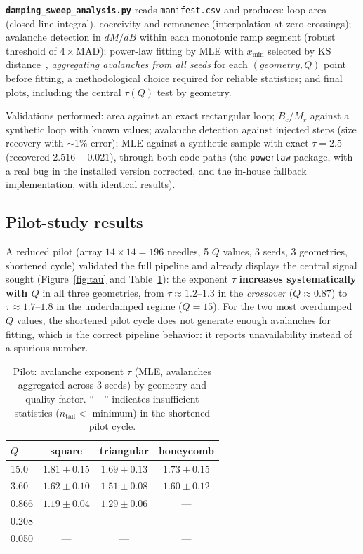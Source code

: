 \documentclass[11pt,a4paper]{article}
\newcommand{\code}[1]{\texttt{#1}}
\begin{document}
\textbf{\code{damping\_sweep\_analysis.py}} reads \code{manifest.csv} and produces: loop area (closed-line integral), coercivity and remanence (interpolation at zero crossings); avalanche detection in $dM/dB$ within each monotonic ramp segment (robust threshold of $4\times$MAD); power-law fitting by MLE with $x_{\min}$ selected by KS distance~\cite{clauset2009}, \emph{aggregating avalanches from all seeds} for each $(geometry, Q)$ point before fitting, a methodological choice required for reliable statistics; and final plots, including the central $\tau(Q)$ test by geometry.

Validations performed: area against an exact rectangular loop; $B_c$/$M_r$ against a synthetic loop with known values; avalanche detection against injected steps (size recovery with $\sim$1\% error); MLE against a synthetic sample with exact $\tau = 2.5$ (recovered $2.516 \pm 0.021$), through both code paths (the \code{powerlaw} package, with a real bug in the installed version corrected, and the in-house fallback implementation, with identical results).

\subsection{Pilot-study results}

A reduced pilot (array $14\times14 = 196$ needles, 5 $Q$ values, 3 seeds, 3 geometries, shortened cycle) validated the full pipeline and already displays the central signal sought (Figure~\ref{fig:tau} and Table~\ref{tab:pilot}): the exponent $\tau$ \textbf{increases systematically with $Q$} in all three geometries, from $\tau \approx 1.2$--$1.3$ in the \emph{crossover} ($Q \approx 0.87$) to $\tau \approx 1.7$--$1.8$ in the underdamped regime ($Q = 15$). For the two most overdamped $Q$ values, the shortened pilot cycle does not generate enough avalanches for fitting, which is the correct pipeline behavior: it reports unavailability instead of a spurious number.

\begin{table}[h]
\centering
\small
\caption{Pilot: avalanche exponent $\tau$ (MLE, avalanches aggregated across 3 seeds) by geometry and quality factor. ``---'' indicates insufficient statistics ($n_{\mathrm{tail}} <$ minimum) in the shortened pilot cycle.}
\label{tab:pilot}
\begin{tabular}{@{}lccc@{}}
\toprule
$Q$ & square & triangular & honeycomb \\
\midrule
15.0  & $1.81 \pm 0.15$ & $1.69 \pm 0.13$ & $1.73 \pm 0.15$ \\
3.60  & $1.62 \pm 0.10$ & $1.51 \pm 0.08$ & $1.60 \pm 0.12$ \\
0.866 & $1.19 \pm 0.04$ & $1.29 \pm 0.06$ & --- \\
0.208 & --- & --- & --- \\
0.050 & --- & --- & --- \\
\bottomrule
\end{tabular}
\end{table}
\end{document}
